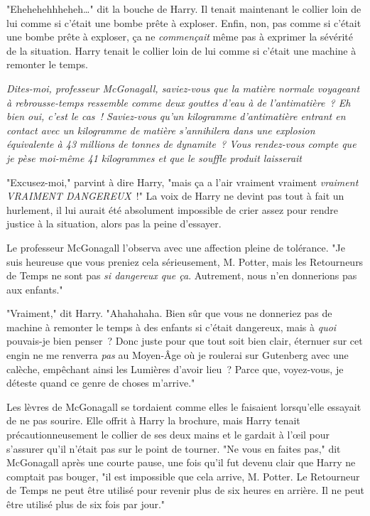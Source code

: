 "Ehehehehhheheh…" dit la bouche de Harry. Il tenait maintenant le collier loin de lui comme si c'était une bombe prête à exploser. Enfin, non, pas comme si c'était une bombe prête à exploser, ça ne \emph{commençait} même pas à exprimer la sévérité de la situation. Harry tenait le collier loin de lui comme si c'était une machine à remonter le temps.

\emph{Dites-moi, professeur McGonagall, saviez-vous que la matière normale voyageant à rebrousse-temps ressemble comme deux gouttes d'eau à de l'antimatière~? Eh bien oui, c'est le cas~! Saviez-vous qu'un kilogramme d'antimatière entrant en contact avec un kilogramme de matière s'annihilera dans une explosion équivalente à 43 millions de tonnes de dynamite~? Vous rendez-vous compte que je pèse moi-même 41 kilogrammes et que le souffle produit laisserait }

"Excusez-moi," parvint à dire Harry, "mais ça a l'air vraiment vraiment \emph{vraiment} \emph{VRAIMENT DANGEREUX}~!" La voix de Harry ne devint pas tout à fait un hurlement, il lui aurait été absolument impossible de crier assez pour rendre justice à la situation, alors pas la peine d'essayer.

Le professeur McGonagall l'observa avec une affection pleine de tolérance. "Je suis heureuse que vous preniez cela sérieusement, M. Potter, mais les Retourneurs de Temps ne sont pas \emph{si dangereux que ça}. Autrement, nous n'en donnerions pas aux enfants."

"Vraiment," dit Harry. "Ahahahaha. Bien sûr que vous ne donneriez pas de machine à remonter le temps à des enfants si c'était dangereux, mais à \emph{quoi} pouvais-je bien penser~? Donc juste pour que tout soit bien clair, éternuer sur cet engin ne me renverra \emph{pas} au Moyen-Âge où je roulerai sur Gutenberg avec une calèche, empêchant ainsi les Lumières d'avoir lieu~? Parce que, voyez-vous, je déteste quand ce genre de choses m'arrive."

Les lèvres de McGonagall se tordaient comme elles le faisaient lorsqu'elle essayait de ne pas sourire. Elle offrit à Harry la brochure, mais Harry tenait précautionneusement le collier de ses deux mains et le gardait à l'œil pour s'assurer qu'il n'était pas sur le point de tourner. "Ne vous en faites pas," dit McGonagall après une courte pause, une fois qu'il fut devenu clair que Harry ne comptait pas bouger, "il est impossible que cela arrive, M. Potter. Le Retourneur de Temps ne peut être utilisé pour revenir plus de six heures en arrière. Il ne peut être utilisé plus de six fois par jour."

